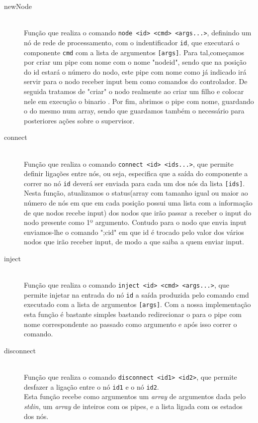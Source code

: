 \documentclass[12pt]{article}
\begin{document}
\begin{description} 
\item[newNode] \hfill \\
    Função que realiza o comando \texttt{node <id> <cmd> <args...>}, definindo um nó de rede de processamento, com o indentificador  \texttt{id}, que executará o componente \texttt{cmd} com a lista de argumentos \texttt{[args]}. Para tal,começamos por criar um pipe com nome com o nome "nodeid", sendo que na posição do id estará o número do nodo, este pipe com nome como já indicado irá servir para o nodo receber input bem como comandos do controlador. De seguida tratamos de "criar" o nodo realmente ao criar um filho e colocar nele em execução o binario . Por fim, abrimos o pipe com nome, guardando o  do mesmo num array, sendo que guardamos também o  necessário para posteriores ações sobre o supervisor.

\item[connect] \hfill \\
    Função que realiza o comando \texttt{connect <id> <ids...>}, que permite definir ligações entre nós, ou seja, especifica que a saída do componente a correr no nó \texttt{id} deverá ser enviada para cada um dos nós da lista \texttt{[ids]}. Nesta função, atualizamos o status(array com tamanho igual ou maior ao número de nós em que em cada posição possui uma lista com a informação de que nodos recebe input) dos nodos que irão passar a receber o input do nodo presente como 1º argumento. Contudo para o nodo que envia input enviamos-lhe o comando ";cid" em que id é trocado pelo valor dos vários nodos que irão receber input, de modo a que saiba a quem enviar input.

\item[inject] \hfill \\
    Função que realiza o comando \texttt{inject <id> <cmd> <args...>}, que permite injetar na entrada do nó \texttt{id} a saída produzida pelo comando cmd executado com a lista de argumentos \texttt{[args]}. Com a nossa implementação esta função é bastante simples bastando redirecionar o  para o pipe com nome correspondente ao passado como argumento e após isso correr o comando. 

\item[disconnect] \hfill \\
Função que realiza o comando \texttt{disconnect <id1> <id2>}, que permite desfazer a ligação entre o nó \texttt{id1} e o nó \texttt{id2}. 
\\Esta função recebe como argumentos um \textit{array} de argumentos dada pelo \textit{stdin}, um \textit{array} de inteiros com os pipes, e a lista ligada com os estados dos nós.


\end{description}
\end{document}
